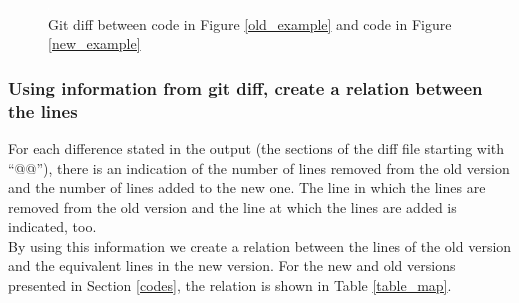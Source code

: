 \documentclass[
]{article}
\begin{document}
\normalsize

\begin{figure}
\centering
\includegraphics{figures/fake.png}
\caption{Git diff between code in Figure \ref{old_example} and code in
Figure \ref{new_example} \label{figure_diff}}
\end{figure}

\subsubsection{Using information from git diff, create a relation between the lines}\label{map}

For each difference stated in the output (the sections of the diff file
starting with ``@@''), there is an indication of the number of lines
removed from the old version and the number of lines added to the new
one. The line in which the lines are removed from the old version and
the line at which the lines are added is indicated, too.\\
By using this information we create a relation between the lines of the
old version and the equivalent lines in the new version. For the new and
old versions presented in Section \ref{codes}, the relation is shown in
Table \ref{table_map}.

\small

\begin{table}

\caption{\label{tab:showing map}Relation between lines of the old version and lines of the new version\label{table_map}}
\centering
{}
\end{table}
\end{document}
